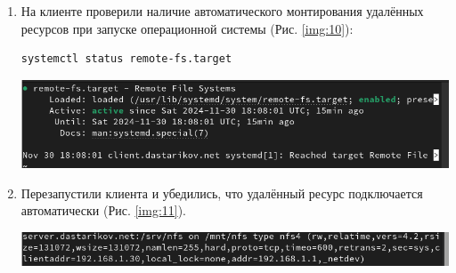 \begin{enumerate}
\item На клиенте проверили наличие автоматического монтирования удалённых ресурсов при запуске операционной системы (Рис. \ref{img:10}):
    \begin{verbatim}
systemctl status remote-fs.target
    \end{verbatim}

\begin{center}
    \centering
    \includegraphics[width=\textwidth]{../images/image10.png}
    \label{img:10}
\end{center}

\item Перезапустили клиента и убедились, что удалённый ресурс подключается автоматически (Рис. \ref{img:11}).

\begin{center}
    \centering
    \includegraphics[width=\textwidth]{../images/image11.png}
    \label{img:11}
\end{center}

\end{enumerate}

